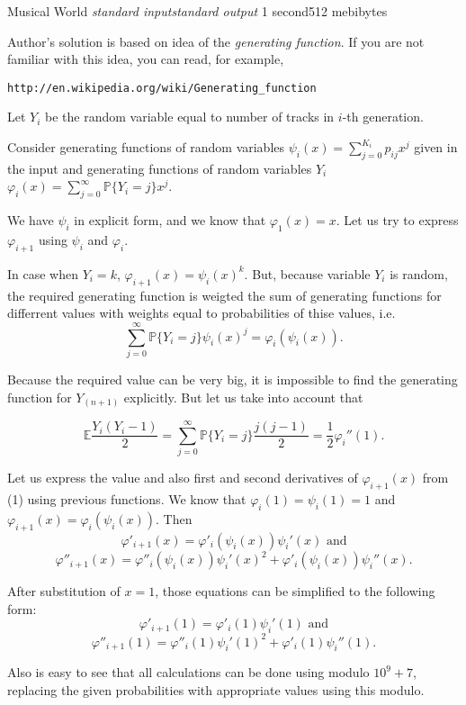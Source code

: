 \begin{problem}{Musical World}
{\textsl{standard input}}{\textsl{standard output}}
{1 second}{512 mebibytes}{}

Author's solution is based on idea of the \emph{generating function}.
If you are not familiar with this idea, you can read, for example,

\verb+http://en.wikipedia.org/wiki/Generating_function+

Let $Y_i$ be the random variable equal to number of tracks in $i$-th
generation.

Consider generating functions of random variables  
$\psi_i(x) = \sum\limits_{j=0}^{K_i}{p_{ij}x^j}$ given in the input
and generating functions of random variables $Y_i$ 
$\varphi_i(x) = \sum\limits_{j=0}^{\infty}{\mathbb{P}\{Y_i=j\}x^j}$.

We have $\psi_i$ in explicit form, and we know that $\varphi_1(x) = x$. 
Let us try to express $\varphi_{i+1}$ using $\psi_{i}$ and $\varphi_{i}$.

In case when $Y_i = k$, $\varphi_{i+1}(x) = \psi_i(x)^k$.
But, because variable $Y_i$ is random, the required generating function
is weigted the sum of generating functions for differrent values
with weights equal to probabilities of thise values, i.e. 
$$\sum\limits_{j=0}^{\infty}{\mathbb{P}\{Y_i=j\}\psi_i(x)^j} =
\varphi_i(\psi_i(x))\text{.}$$

Because the required value can be very big, it is impossible to find
the generating function for $Y_(n+1)$ explicitly.
But let us take into account that

$$\mathbb{E}\frac{Y_i(Y_i-1)}{2} =
\sum\limits_{j=0}^{\infty}{\mathbb{P}\{Y_i=j\}\frac{j(j-1)}{2}} =
\frac{1}{2}\varphi_i''(1)\text{.}$$

Let us express the value and also first and second derivatives
of $\varphi_{i+1}(x)$ from (1) using previous functions.
We know that $\varphi_i(1) = \psi_i(1) = 1$ and
$\varphi_{i+1}(x) = \varphi_i(\psi_i(x))$.
Then $$\varphi'_{i+1}(x) = \varphi'_{i}(\psi_i(x))\psi_{i}'(x)\text{ and}$$
$$\varphi''_{i+1}(x) = \varphi''_{i}(\psi_i(x))\psi_{i}'(x)^2 +
\varphi'_{i}(\psi_i(x))\psi_{i}''(x)\text{.}$$

After substitution of $x = 1$, those equations can be simplified
to the following form:
$$\varphi'_{i+1}(1) = \varphi'_{i}(1)\psi_{i}'(1)\text{ and}$$
$$\varphi''_{i+1}(1) = \varphi''_{i}(1)\psi_{i}'(1)^2 +
\varphi'_{i}(1)\psi_{i}''(1)\text{.}$$

Also is easy to see that all calculations can be done using modulo $10^9+7$,
replacing the given probabilities with appropriate values using this modulo.

\end{problem}
